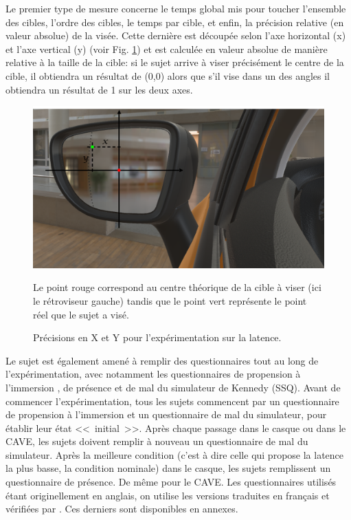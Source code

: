 	\par Le premier type de mesure concerne le temps global mis pour toucher l'ensemble des cibles, l'ordre des cibles, le temps par cible, et enfin, la précision relative (en valeur absolue) de la visée. Cette dernière est découpée selon l'axe horizontal (x) et l'axe vertical (y) (voir Fig. \ref{fig:x_y_precision_latency}) et est calculée en valeur absolue de manière relative à la taille de la cible: si le sujet arrive à viser précisément le centre de la cible, il obtiendra un résultat de (0,0) alors que s'il vise dans un des angles il obtiendra un résultat de 1 sur les deux axes.
	
	\begin{figure}
		\centering
		\includegraphics[scale=.65]{Figures/XYPrecision}
		\caption{Précisions en X et Y pour l'expérimentation sur la latence.}{Le point rouge correspond au centre théorique de la cible à viser (ici le rétroviseur gauche) tandis que le point vert représente le point réel que le sujet a visé.}
		\label{fig:x_y_precision_latency}
	\end{figure}
	
	\par Le sujet est également amené à remplir des questionnaires tout au long de l'expérimentation, avec notamment les questionnaires de propension à l'immersion \citep{witmer_measuring_1998}, de présence \citep{witmer_measuring_1998} et de mal du simulateur de Kennedy (SSQ). Avant de commencer l'expérimentation, tous les sujets commencent par un questionnaire de propension à l'immersion et un questionnaire de mal du simulateur, pour établir leur état <<~initial~>>. Après chaque passage dans le casque ou dans le CAVE, les sujets doivent remplir à nouveau un questionnaire de mal du simulateur. Après la meilleure condition (c'est à dire celle qui propose la latence la plus basse, la condition nominale) dans le casque, les sujets remplissent un questionnaire de présence. De même pour le CAVE. Les questionnaires utilisés étant originellement en anglais, on utilise les versions traduites en français et vérifiées par \cite{bouchard_revising_2007, bouchard_side_2009, bouchard_exploring_2011}. Ces derniers sont disponibles en annexes.
	
